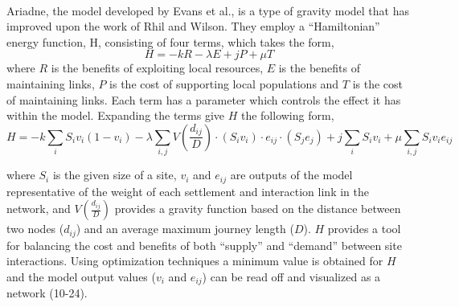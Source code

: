 \documentclass[12pt,a4paper]{thesis}
\begin{document}
\paragraph{}
Ariadne, the model developed by Evans et al., is a type of gravity model that has improved upon the work of Rhil and Wilson. They employ a ``Hamiltonian'' energy function, H, consisting of four terms, which takes the form,
			\begin{equation}
			H = -kR - \lambda E + jP + \mu T
			\label{eq:simpleHam}
			\end{equation}  
where $R$ is the benefits of exploiting local resources, $E$ is the benefits of maintaining links, $P$ is the cost of supporting local populations and $T$ is the cost of maintaining links. Each term has a parameter which controls the effect it has within the model. Expanding the terms give $H$ the following form,
			\begin{equation}
			H = -k\sum_{i}S_{i}v_{i}(1-v_{i}) - \lambda\sum_{i,j}V(\frac{d_{ij}}{D})\cdot(S_{i}v_{i})\cdot e_{ij}\cdot (S_{j}e_{j}) + j\sum_{i}S_{i}v_{i} + \mu\sum_{i,j}S_{i}v_{i}e_{ij}
			\label{eq:expandedHam}
			\end{equation}

where $S_{i}$ is the given size of a site, $v_{i}$ and $e_{ij}$ are outputs of the model representative of the weight of each settlement and interaction link in the network, and $V(\frac{d_{ij}}{D})$ provides a gravity function based on the distance between two nodes ($d_{ij}$) and an average maximum journey length ($D$). $H$ provides a tool for balancing the cost and benefits of both ``supply'' and ``demand'' between site interactions. Using optimization techniques a minimum value is obtained for $H$ and the model output values ($v_{i}$ and $e_{ij}$) can be read off and visualized as a network (10-24). 
\end{document}
